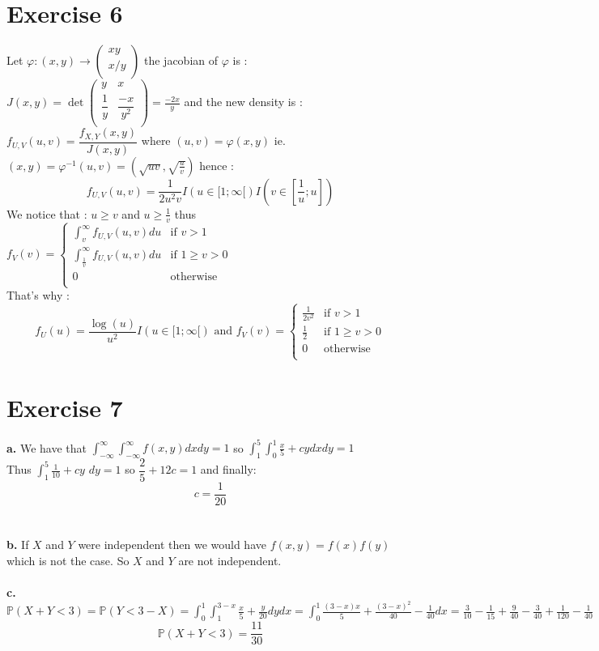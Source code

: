 \documentclass{article}
\begin{document}
\section*{Exercise 6}
Let $\varphi : (x,y)\to \left(\begin{array}{c}
    xy\\
    x/y\\
\end{array}\right)$ the jacobian of $\varphi$ is : $J(x,y) = \det\left(\begin{array}{cc}
        y & x \\
        \dfrac{1}{y} & \dfrac{-x}{y^2}\\
\end{array}\right) = \frac{-2x}{y}$ and the new density is : $f_{U,V}(u,v) = \dfrac{f_{X,Y}(x,y)}{J(x,y)}$ where $(u,v) = \varphi(x,y)$ ie. $(x,y) = \varphi^{-1}(u,v) = (\sqrt{uv}, \sqrt{\frac{u}{v}})$ hence :
$$\boxed{f_{U,V}(u,v) = \dfrac{1}{2u^2v}I(u\in[1;\infty[)I\left(v\in\left[\dfrac{1}{u};u\right]\right)}$$
We notice that : $u\ge v$ and $u\ge \frac{1}{v}$ thus $f_V(v) = \left\{\begin{array}{cl}
    \int_v^\infty f_{U,V}(u,v)du & \text{if } v>1\\
    \int_\frac{1}{v}^\infty f_{U,V}(u,v)du & \text{if } 1\ge v>0\\
    0 & \text{otherwise}\\
\end{array}\right.$
\\
That's why : $$\boxed{ f_U(u) = \frac{\log(u)}{u^2}I(u\in[1;\infty[)\text{ and }f_V(v)= \left\{\begin{array}{cl}
    \frac{1}{2v^2} & \text{if } v>1\\
    \frac{1}{2} & \text{if } 1\ge v>0\\
    0 & \text{otherwise}\\
\end{array}\right.}$$
\section*{Exercise 7}
\textbf{a.} We have that $\int_{-\infty}^{\infty}\int_{-\infty}^\infty f(x,y)dxdy = 1$ so $\int_1^5\int_0^1\frac{x}{5}+cydxdy = 1$\\
Thus $\int_1^5\frac{1}{10}+cy$ $dy = 1$ so $\dfrac{2}{5}+12c = 1$ and finally: $$\boxed{c=\dfrac{1}{20}}$$
\\\\
\textbf{b. }If $X$ and $Y$ were independent then we would have $f(x,y)=f(x)f(y)$ which is not the case. So $X$ and $Y$ are not independent.
\\\\
\textbf{c. }$\mathbb{P}(X+Y<3) = \mathbb{P}(Y<3-X) = \int_0^1\int_1^{3-x}\frac{x}{5}+\frac{y}{20}dydx = \int_0^1\frac{(3-x)x}{5}+\frac{(3-x)^2}{40}-\frac{1}{40}dx =\frac{3}{10}-\frac{1}{15}+\frac{9}{40}-\frac{3}{40}+\frac{1}{120}-\frac{1}{40}$
$$\boxed{\mathbb{P}(X+Y<3) = \dfrac{11}{30}}$$
\end{document}
